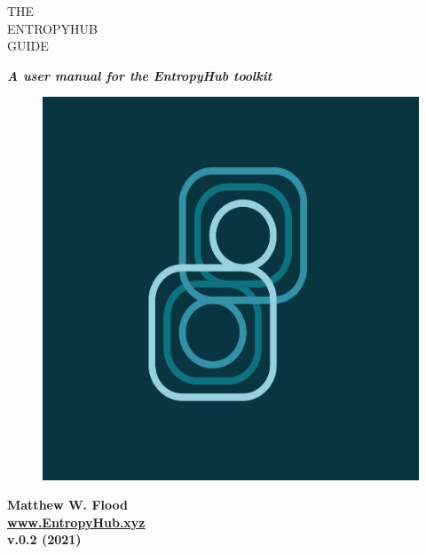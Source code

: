 \begin{titlepage}
\color{ehone}
\fontsize{60pt}{72pt}
\noindent THE \\ ENTROPYHUB \\ GUIDE\\ 
\vspace{5mm}
\normalfont		
   \begin{center}
    \Large
	\noindent \textbf{\textit{A user manual for the EntropyHub toolkit}} \\
   \end{center}
 
\vspace{7cm}
\begin{figure}
\includegraphics[width=1\linewidth]{EntropyHub_profiler.png} 
\label{fig:wrapfig}
\end{figure}

\normalsize 
\noindent \textbf{Matthew W. Flood}	
\newline \\ \newline
\noindent \href{https://www.EntropyHub.xyz}{\ul{\textbf{www.EntropyHub.xyz}}} 
\newline \\ \newline
\noindent \textbf{v.0.2 (2021)}

\normalsize
\color{black}
\end{titlepage}



